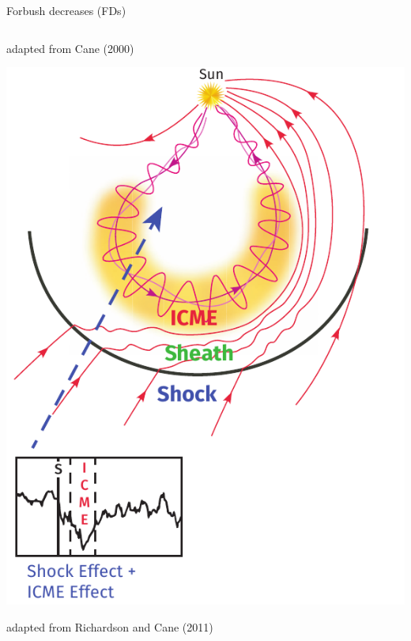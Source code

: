 \documentclass[10pt,aspectratio=169,usenames,dvipsnames]{beamer}
\begin{document}
\begin{frame}{Forbush decreases (FDs)}
\begin{columns}[t]
\begin{column}{0.35\textwidth}
\begin{overprint}
                \begin{flushright}
                    \scriptsize adapted from Cane (2000)
                \end{flushright}    
                \includegraphics[width=\textwidth]{images/RichardsonCane-adapted.pdf}
                \begin{flushright}
                    \scriptsize adapted from Richardson and Cane (2011)
                \end{flushright}    
                \vskip1cm

\end{overprint}
\end{column}
\end{columns}
\end{frame}
\end{document}
